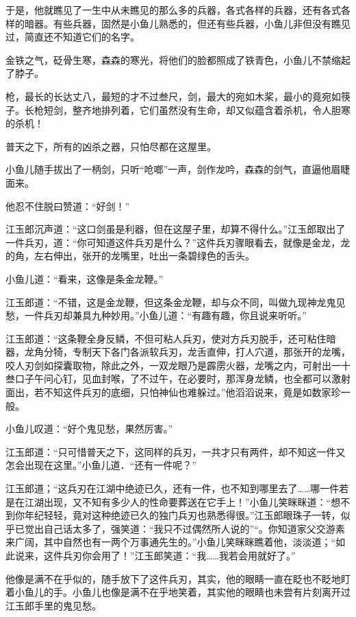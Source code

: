 \documentclass[12pt,oneside]{book}
\begin{document}
于是，他就瞧见了一生中从未瞧见的那么多的兵器，各式各样的兵器，还有各式各样的暗器。有些兵器，固然是小鱼儿熟悉的，但还有些兵器，小鱼儿非但没有瞧见过，简直还不知道它们的名字。

金铁之气，砭骨生寒，森森的寒光，将他们的脸都照成了铁青色，小鱼儿不禁缩起了脖子。

枪，最长的长达丈八，最短的才不过叁尺，剑，最大的宛如木桨，最小的竟宛如筷子。长枪短剑，整齐地排列着，它们虽然没有生命，却又似蕴含着杀机，令人胆寒的杀机！

普天之下，所有的凶杀之器，只怕尽都在这屋里。

小鱼儿随手拔出了一柄剑，只听``呛啷''一声，剑作龙吟，森森的剑气，直逼他眉睫面来。

他忍不住脱曰赞道：``好剑！''

江玉郎沉声道：``这口剑虽是利器，但在这屋子里，却算不得什么。''江玉郎取出了一件兵刃，道：``你可知道这件兵刃是什么？''这件兵刃骤眼看去，就像是金龙，龙的角，左右伸出，张开的龙嘴里，吐出一条碧绿色的舌头。

小鱼儿道：``看来，这像是条金龙鞭。''

江玉郎道：``不错，这是金龙鞭，但这条金龙鞭，却与众不同，叫做九现神龙鬼见愁，一件兵刃却兼具九种妙用。''小鱼儿道：``有趣有趣，你且说来听听。''

江玉郎道：``这条鞭全身反鳞，不但可粘人兵刃，使对方兵刃脱手，还可粘住暗器，龙角分犄，专制天下各门各派软兵刃，龙舌直伸，打人穴道，那张开的龙嘴，咬人刃剑如探囊取物，除此之外，一双龙眼乃是霹雳火器，龙嘴之内，可射出一十叁口子午问心钉，见血封喉，了不过午，在必要时，那浑身龙鳞，也全都可以激射面出，若不知这件兵刃的底细，只怕神仙也难躲过。''他滔滔说来，竟是如数家珍一般。

小鱼儿叹道：``好个鬼见愁，果然厉害。''

江玉郎道：``只可惜普天之下，这同样的兵刃，一共才只有两件，却不知这一件又怎会出现在这里。''小鱼儿道．``还有一件呢？''

江玉郎道；``这兵刃在江湖中绝迹已久，还有一件，也不知到哪里去了\ldots\ldots 哪一件若是在江湖出现，又不知有多少人的性命要葬送在它手上！''小鱼儿笑眯眯道：``想不到你年纪轻轻，竟对这种绝迹已久的独门兵刃也熟悉得很。''江玉郎眼珠子一转，似乎已觉出自己话太多了，强笑道：``我只不过偶然所人说的''``。你知道家父交游素来广阔，其中自然也有一两个万事通先生的。''小鱼儿笑眯眯瞧着他，淡淡道；``如此说来，这件兵刃你会用了！''江玉郎笑道：``我\ldots\ldots 我若会用就好了。''

他像是满不在乎似的，随手放下了这件兵刃，其实，他的眼睛一直在眨也不眨地盯着小鱼儿的手。小鱼儿也像是满不在乎地笑着，其实他的眼睛也未尝有片刻离开过江玉郎手里的鬼见愁。
\end{document}
